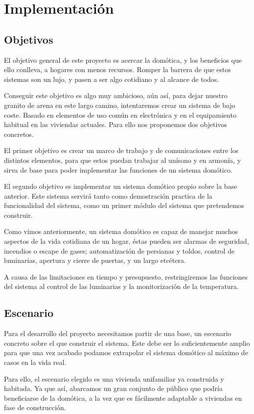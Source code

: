 \chapter{Implementación}
 \section{Objetivos}
 El objetivo general de este proyecto es acercar la domótica, y los beneficios que ello conlleva, a hogares con menos recursos. Romper la barrera de que estos sistemas son un lujo, y pasen a ser algo cotidiano y al alcance de todos.
 
  Conseguir este objetivo es algo muy ambicioso, aún así, para dejar nuestro granito de arena en este largo camino, intentaremos crear un sistema de bajo coste. Basado en elementos de uso común en  electrónica y en el equipamiento habitual en las viviendas actuales.  Para ello nos proponemos dos objetivos concretos.
  
  El primer objetivo es crear un marco de trabajo y de comunicaciones entre los distintos elementos, para que estos puedan trabajar al unísono y en armonía, y sirva de base para poder implementar las funciones de un sistema domótico.
  
  El segundo objetivo es implementar  un sistema domótico propio sobre la base anterior. Este sistema servirá tanto como demostración practica de la funcionalidad del sistema, como un primer módulo del sistema que pretendemos construir.
  
  Como vimos anteriormente, un sistema domótico es capaz de manejar muchos aspectos de la vida cotidiana de un hogar, éstas pueden ser alarmas de seguridad, incendios o escape de gases; automatización de persianas y toldos, control de luminarias, apertura y cierre de puertas, y un largo etcétera. 
  
  A causa de las limitaciones en tiempo y presupuesto, restringiremos las funciones del sistema al control de las luminarias y la monitorización de la temperatura.

\section{Escenario}
Para el desarrollo del proyecto necesitamos partir de una base, un escenario concreto sobre el que construir el sistema. Este debe ser lo suficientemente amplio para que una vez acabado podamos extrapolar el sistema domótico al máximo de casos en la vida real.

Para ello, el escenario elegido es una vivienda unifamiliar ya construida y habitada. Ya que así, abarcamos  un gran conjunto de público que podría beneficiarse de la domótica, a la vez que es fácilmente adaptable a viviendas en fase de construcción.


